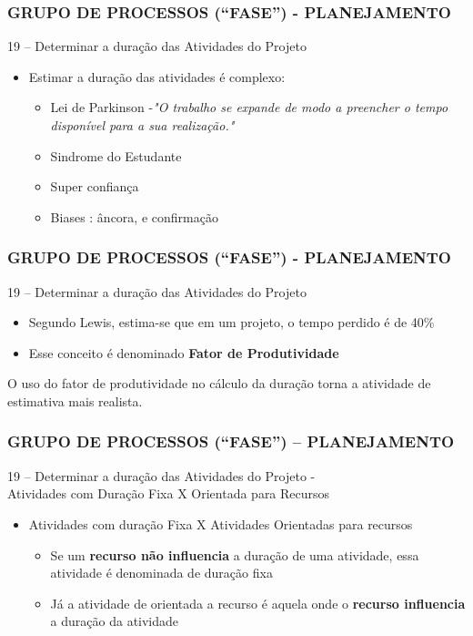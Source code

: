 \begin{frame}
 \frametitle{GRUPO DE PROCESSOS (“FASE”) - PLANEJAMENTO}
19 – Determinar a duração das Atividades do Projeto
  \begin{itemize}
   \item Estimar a duração das atividades é complexo:
   \begin{itemize}
    \item Lei de Parkinson -\textit{"O trabalho se expande de modo a preencher o tempo disponível para a sua realização."}
   \item Sindrome do Estudante
   \item Super confiança
   \item Biases : âncora, e confirmação
   \end{itemize} 
   \end{itemize} 
\end{frame}


\begin{frame}
 \frametitle{GRUPO DE PROCESSOS (“FASE”) - PLANEJAMENTO}
19 – Determinar a duração das Atividades do Projeto
  \begin{itemize}
   \item Segundo Lewis, estima-se que em um projeto, o tempo perdido é de 40\%
   \item Esse conceito é denominado \textbf{Fator de Produtividade}
  \end{itemize}
  \begin{block}{}
   O uso do fator de produtividade no cálculo da duração torna a atividade de estimativa mais realista.
  \end{block}
\end{frame}

\begin{frame}
 \frametitle{GRUPO DE PROCESSOS (“FASE”) – PLANEJAMENTO}
19 – Determinar a duração das Atividades do Projeto - \\
Atividades com Duração Fixa X Orientada para Recursos
  \begin{itemize}
   \item Atividades com duração Fixa X Atividades Orientadas para recursos
  \begin{itemize}
   \item Se um \textbf{recurso não influencia} a duração de uma atividade, essa atividade é denominada de duração fixa
   \item Já a atividade de orientada a recurso é aquela onde o \textbf{recurso influencia} a duração da atividade
  \end{itemize}
  \end{itemize}
\end{frame}

